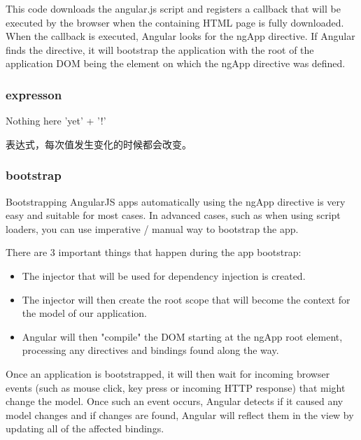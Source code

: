 This code downloads the angular.js script and registers a callback that will be executed by the browser when the containing HTML page is fully downloaded. When the callback is executed, Angular looks for the ngApp directive. If Angular finds the directive, it will bootstrap the application with the root of the application DOM being the element on which the ngApp directive was defined.



\subsubsection{expresson}

\begin{HTML5}[ng-app]
Nothing here {{'yet' + '!'}}
\end{HTML5}

表达式，每次值发生变化的时候都会改变。


\subsubsection{bootstrap}

Bootstrapping AngularJS apps automatically using the ngApp directive is very easy and suitable for most cases. In advanced cases, such as when using script loaders, you can use imperative / manual way to bootstrap the app.


There are 3 important things that happen during the app bootstrap:

\begin{itemize}

\item The injector that will be used for dependency injection is created.

\item The injector will then create the root scope that will become the context for the model of our application.

\item Angular will then "compile" the DOM starting at the ngApp root element, processing any directives and bindings found along the way.

\end{itemize}



Once an application is bootstrapped, it will then wait for incoming browser events (such as mouse click, key press or incoming HTTP response) that might change the model. Once such an event occurs, Angular detects if it caused any model changes and if changes are found, Angular will reflect them in the view by updating all of the affected bindings.

